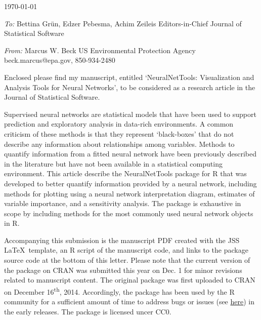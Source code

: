 \documentclass[a4paper,12pt]{article}
\begin{document}
\renewcommand{\rmdefault}{ptm}
\pagestyle{empty} 
\small

\setlength{\parindent}{0mm} 
\setlength{\parskip}{5mm}

\begin{flushright}
\today
\end{flushright}

\vfill
\emph{To:}\newline
Bettina Gr\"un, Edzer Pebesma, Achim Zeileis\newline
Editors-in-Chief\newline
Journal of Statistical Software

\emph{From:}\newline
Marcus W. Beck\newline
US Environmental Protection Agency\newline
beck.marcus@epa.gov, 850-934-2480\vspace{0.1in}

Enclosed please find my manuscript, entitled `NeuralNetTools: Visualization and Analysis Tools for Neural Networks', to be considered as a research article in the Journal of Statistical Software. 

Supervised neural networks are statistical models that have been used to support prediction and exploratory analysis in data-rich environments.  A common criticism of these methods is that they represent `black-boxes' that do not describe any information about relationships among variables.  Methods to quantify information from a fitted neural network have been previously described in the literature but have not been available in a statistical computing environment.  This article describe the NeuralNetTools package for R that was developed to better quantify information provided by a neural network, including methods for plotting using a neural network interpretation diagram, estimates of variable importance, and a sensitivity analysis.  The package is exhaustive in scope by including methods for the most commonly used neural network objects in R.   

Accompanying this submission is the manuscript PDF created with the JSS \LaTeX\ template, an R script of the manuscript code, and links to the package source code at the bottom of this letter.  Please note that the current version of the package on CRAN was submitted this year on Dec. 1 for minor revisions related to manuscript content.  The original package was first uploaded to CRAN on December 16\textsuperscript{th}, 2014.  Accordingly, the package has been used by the R community for a sufficient amount of time to address bugs or issues (see \href{https://github.com/fawda123/NeuralNetTools/issues?q=is%3Aissue+is%3Aclosed}{here}) in the early releases.  The package is licensed uncer CC0.   
\end{document}
